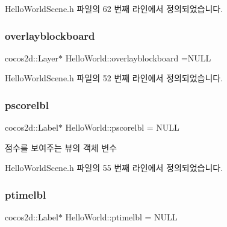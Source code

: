 Hello\+World\+Scene.\+h 파일의 62 번째 라인에서 정의되었습니다.

\mbox{\label{class_hello_world_acc967707dff45c20f68321f07c86a21b}} 
\subsubsection{\texorpdfstring{overlayblockboard}{overlayblockboard}}
{\footnotesize\ttfamily cocos2d\+::\+Layer$\ast$ Hello\+World\+::overlayblockboard =N\+U\+LL\hspace{0.3cm}{\ttfamily [protected]}}



Hello\+World\+Scene.\+h 파일의 52 번째 라인에서 정의되었습니다.

\mbox{\label{class_hello_world_a7ed25294d2c42aec8b7b8f37bbf75a38}} 
\subsubsection{\texorpdfstring{pscorelbl}{pscorelbl}}
{\footnotesize\ttfamily cocos2d\+::\+Label$\ast$ Hello\+World\+::pscorelbl = N\+U\+LL\hspace{0.3cm}{\ttfamily [protected]}}



점수를 보여주는 뷰의 객체 변수 



Hello\+World\+Scene.\+h 파일의 55 번째 라인에서 정의되었습니다.

\mbox{\label{class_hello_world_ae0520bbadc78c24a50ddeb3f839b4012}} 
\subsubsection{\texorpdfstring{ptimelbl}{ptimelbl}}
{\footnotesize\ttfamily cocos2d\+::\+Label$\ast$ Hello\+World\+::ptimelbl = N\+U\+LL\hspace{0.3cm}{\ttfamily [protected]}}



